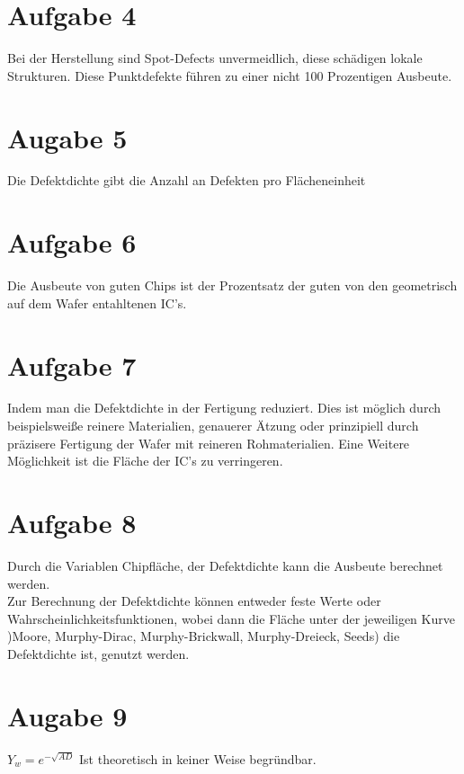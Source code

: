 \documentclass[a4paper]{scrartcl}
\begin{document}
\section*{Aufgabe 4}
Bei der Herstellung sind Spot-Defects unvermeidlich, diese schädigen lokale Strukturen. Diese Punktdefekte führen zu einer nicht 100 Prozentigen Ausbeute.


\section*{Augabe 5}
Die Defektdichte gibt die Anzahl an Defekten pro Flächeneinheit 


\section*{Aufgabe 6}
Die Ausbeute von guten Chips ist der Prozentsatz der guten von den geometrisch auf dem Wafer entahltenen IC's.


\section*{Aufgabe 7}
Indem man die Defektdichte in der Fertigung reduziert. Dies ist möglich durch beispielsweiße reinere Materialien, genauerer Ätzung oder prinzipiell durch präzisere Fertigung  der Wafer mit reineren Rohmaterialien. Eine Weitere Möglichkeit ist die Fläche der IC's zu verringeren.


\section*{Aufgabe 8}
Durch die Variablen Chipfläche, der Defektdichte kann die Ausbeute berechnet werden.\\
Zur Berechnung der Defektdichte können entweder feste Werte oder Wahrscheinlichkeitsfunktionen, wobei dann die Fläche unter der jeweiligen Kurve )Moore, Murphy-Dirac, Murphy-Brickwall, Murphy-Dreieck, Seeds) die Defektdichte ist, genutzt werden.

\section*{Augabe 9}
$Y_w = e^{-\sqrt{AD}}$
Ist theoretisch in keiner Weise begründbar.
\end{document}
